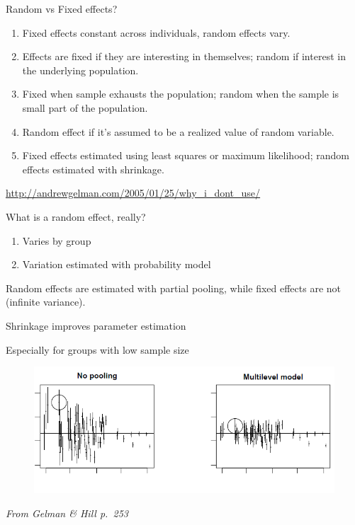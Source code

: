 \documentclass[10pt,ignorenonframetext,]{beamer}
\begin{document}
\begin{frame}{Random vs Fixed effects?}

\begin{enumerate}[<+->]
\def\labelenumi{\arabic{enumi}.}
\item
  Fixed effects constant across individuals, random effects vary.
\item
  Effects are fixed if they are interesting in themselves; random if
  interest in the underlying population.
\item
  Fixed when sample exhausts the population; random when the sample is
  small part of the population.
\item
  Random effect if it's assumed to be a realized value of random
  variable.
\item
  Fixed effects estimated using least squares or maximum likelihood;
  random effects estimated with shrinkage.
\end{enumerate}

\url{http://andrewgelman.com/2005/01/25/why_i_dont_use/}

\end{frame}

\begin{frame}{What is a random effect, really?}

\begin{enumerate}[<+->]
\def\labelenumi{\arabic{enumi}.}
\item
  Varies by group
\item
  Variation estimated with probability model
\end{enumerate}

Random effects are estimated with partial pooling, while fixed effects
are not (infinite variance).

\end{frame}

\begin{frame}{Shrinkage improves parameter estimation}

Especially for groups with low sample size

\begin{figure}[htbp]
\centering
\includegraphics{images/shrinkage.png}
\caption{}
\end{figure}

\emph{From Gelman \& Hill p.~253}

\end{frame}
\end{document}
